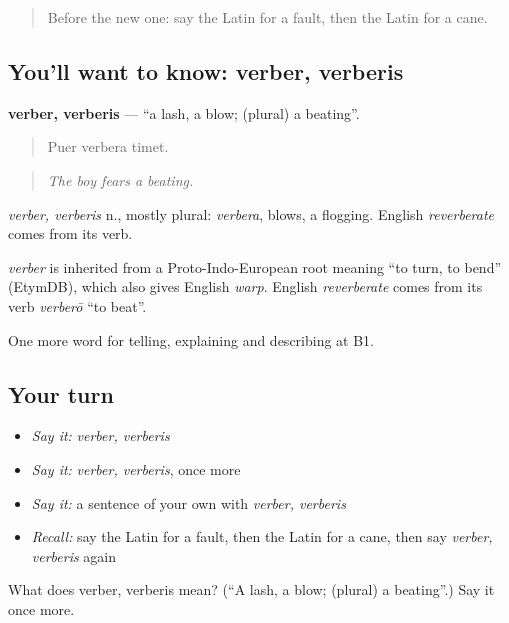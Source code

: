 \begin{quote}
Before the new one: say the Latin for a fault, then the Latin for a cane.
\end{quote}

\subsection*{You'll want to know: verber, verberis}
\textbf{verber, verberis} — \textquotedblleft{}a lash, a blow; (plural) a beating\textquotedblright{}.

\begin{quote}
Puer verbera timet.
\end{quote}

\begin{quote}
\emph{The boy fears a beating.}
\end{quote}

\emph{verber, verberis} n., mostly plural: \emph{verbera}, blows, a flogging. English \emph{reverberate} comes from its verb.

\begin{cousinweb}
\emph{verber} is inherited from a Proto-Indo-European root meaning \textquotedblleft{}to turn, to bend\textquotedblright{} (EtymDB), which also gives English \emph{warp}. English \emph{reverberate} comes from its verb \emph{verberō} \textquotedblleft{}to beat\textquotedblright{}.
\end{cousinweb}

\begin{grammarlens}[title={What you've built}]
One more word for telling, explaining and describing at B1.
\end{grammarlens}

\subsection*{Your turn}
\begin{itemize}
\raggedright
  \item \emph{Say it:} \emph{verber, verberis}
  \item \emph{Say it:} \emph{verber, verberis}, once more
  \item \emph{Say it:} a sentence of your own with \emph{verber, verberis}
  \item \emph{Recall:} say the Latin for a fault, then the Latin for a cane, then say \emph{verber, verberis} again
\end{itemize}

\begin{tcolorbox}[breakable,colback=teal!4,colframe=teal!35!black,title={Before you move on}]
What does verber, verberis mean? (\textquotedblleft{}A lash, a blow; (plural) a beating\textquotedblright{}.) Say it once more.
\end{tcolorbox}
